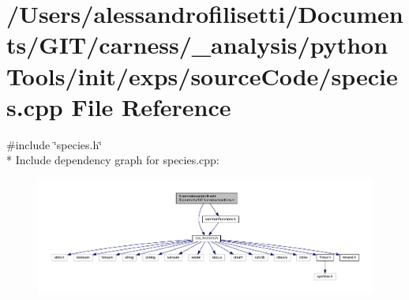 \hypertarget{a00078}{\section{/\-Users/alessandrofilisetti/\-Documents/\-G\-I\-T/carness/\-\_\-analysis/python\-Tools/init/exps/source\-Code/species.cpp File Reference}
\label{a00078}
}
{\ttfamily \#include \char`\"{}species.\-h\char`\"{}}\\*
Include dependency graph for species.\-cpp\-:
\nopagebreak
\begin{figure}[H]
\begin{center}
\leavevmode
\includegraphics[width=350pt]{a00200}
\end{center}
\end{figure}
